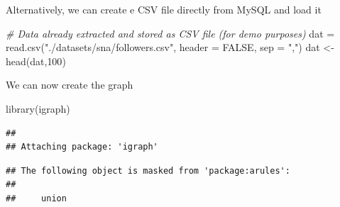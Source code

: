 \documentclass[
]{book}
\newenvironment{Shaded}{\begin{snugshade}}{\end{snugshade}}
\newcommand{\AttributeTok}[1]{\textcolor[rgb]{0.77,0.63,0.00}{#1}}
\newcommand{\CommentTok}[1]{\textcolor[rgb]{0.56,0.35,0.01}{\textit{#1}}}
\newcommand{\ConstantTok}[1]{\textcolor[rgb]{0.00,0.00,0.00}{#1}}
\newcommand{\DecValTok}[1]{\textcolor[rgb]{0.00,0.00,0.81}{#1}}
\newcommand{\FunctionTok}[1]{\textcolor[rgb]{0.00,0.00,0.00}{#1}}
\newcommand{\NormalTok}[1]{#1}
\newcommand{\OtherTok}[1]{\textcolor[rgb]{0.56,0.35,0.01}{#1}}
\newcommand{\SpecialCharTok}[1]{\textcolor[rgb]{0.00,0.00,0.00}{#1}}
\newcommand{\StringTok}[1]{\textcolor[rgb]{0.31,0.60,0.02}{#1}}
\begin{document}
Alternatively, we can create e CSV file directly from MySQL and load it

\begin{Shaded}
\end{Shaded}

\begin{Shaded}
\begin{Highlighting}[]
\CommentTok{\# Data already extracted and stored as CSV file (for demo purposes)}
\NormalTok{dat }\OtherTok{=} \FunctionTok{read.csv}\NormalTok{(}\StringTok{"./datasets/sna/followers.csv"}\NormalTok{, }\AttributeTok{header =} \ConstantTok{FALSE}\NormalTok{, }\AttributeTok{sep =} \StringTok{","}\NormalTok{)}
\NormalTok{dat }\OtherTok{\textless{}{-}} \FunctionTok{head}\NormalTok{(dat,}\DecValTok{100}\NormalTok{)}
\end{Highlighting}
\end{Shaded}

We can now create the graph

\begin{Shaded}
\begin{Highlighting}[]
\FunctionTok{library}\NormalTok{(igraph)}
\end{Highlighting}
\end{Shaded}

\begin{verbatim}
## 
## Attaching package: 'igraph'
\end{verbatim}

\begin{verbatim}
## The following object is masked from 'package:arules':
## 
##     union
\end{verbatim}
\end{document}
